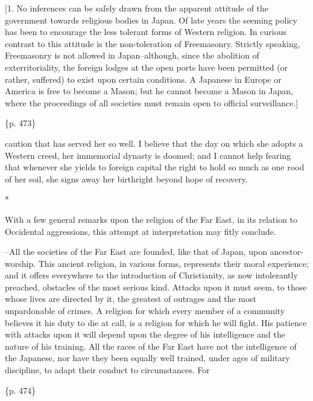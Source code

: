 [1. No inferences can be safely drawn from the apparent attitude of the government towards religious bodies in Japan. Of late years the seeming policy has been to encourage the less tolerant forms of Western religion. In curious contrast to this attitude is the non-toleration of Freemasonry. Strictly speaking, Freemasonry is not allowed in Japan--although, since the abolition of exterritoriality, the foreign lodges at the open ports have been permitted (or rather, suffered) to exist upon certain conditions. A Japanese in Europe or America is free to become a Mason; but he cannot become a Mason in Japan, where the proceedings of all societies must remain open to official surveillance.]

\{p. 473\}

caution that has served her so well. I believe that the day on which she adopts a Western creed, her immemorial dynasty is doomed; and I cannot help fearing that whenever she yields to foreign capital the right to hold so much as one rood of her soil, she signs away her birthright beyond hope of recovery.

*

With a few general remarks upon the religion of the Far East, in its relation to Occidental aggressions, this attempt at interpretation may fitly conclude.

--All the societies of the Far East are founded, like that of Japan, upon ancestor-worship. This ancient religion, in various forms, represents their moral experience; and it offers everywhere to the introduction of Christianity, as now intolerantly preached, obstacles of the most serious kind. Attacks upon it must seem, to those whose lives are directed by it, the greatest of outrages and the most unpardonable of crimes. A religion for which every member of a community believes it his duty to die at call, is a religion for which he will fight. His patience with attacks upon it will depend upon the degree of his intelligence and the nature of his training. All the races of the Far East have not the intelligence of the Japanese, nor have they been equally well trained, under ages of military discipline, to adapt their conduct to circumstances. For

\{p. 474\}


